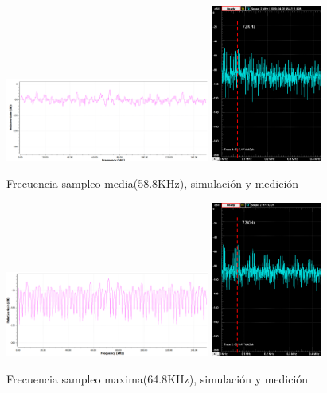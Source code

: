\documentclass[../../ASSD_TP1_G7.tex]{subfiles}
\begin{document}
\begin{figure}[H]
\centering
{}
{\includegraphics[width=0.6\textwidth]{figures/simpto_8_syh_58,8_espectro.png}}
{\includegraphics[width=0.32\textwidth]{figures/pto_8_syh_58,8_espectro.png}}
\caption{Frecuencia sampleo media(58.8KHz), simulación y medición}
\end{figure}

\begin{figure}[H]
\centering
{}
{\includegraphics[width=0.6\textwidth]{figures/simpto_8_syh_64,8_espectro.png}}
{\includegraphics[width=0.32\textwidth]{figures/pto_8_syh_64,8_espectro.png}}
\caption{Frecuencia sampleo maxima(64.8KHz), simulación y medición}
\end{figure}
\end{document}
